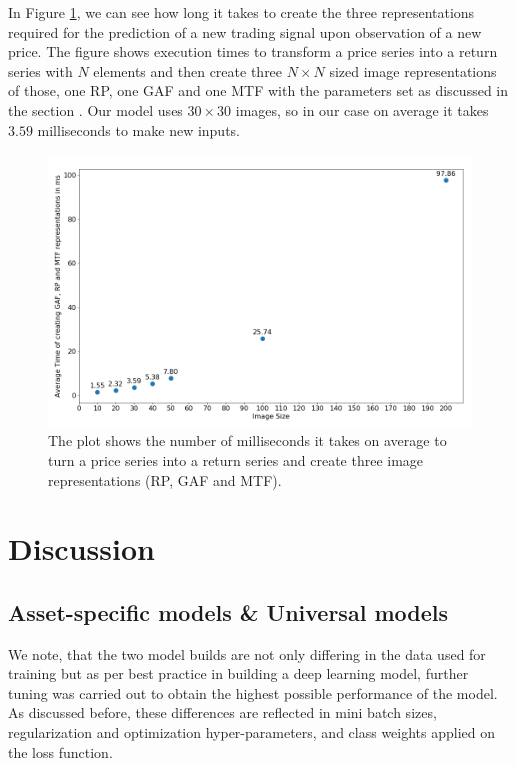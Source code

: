 \documentclass[12pt, a4paper]{article}
\begin{document}
In Figure \ref{fig:imageCrea}, we can see how long it takes to create the three representations required for the prediction of a new trading signal upon observation of a new price. The figure shows execution times to transform a price series into a return series with $N$ elements and then create three $N \times N$ sized image representations of those, one RP, one GAF and one MTF with the parameters set as discussed in the section . Our model uses $30 \times 30$ images, so in our case on average it takes $3.59$ milliseconds to make new inputs. 

\begin{figure}[h]
    \centering
    \includegraphics[width=\textwidth]{images/Image_Trf_Times.png}
    \caption{The plot shows the number of milliseconds it takes on average to turn a price series into a return series and create three image representations (RP, GAF and MTF).}
    \label{fig:imageCrea}
\end{figure}

\section{Discussion}
\label{sec:Discuss}

\subsection{Asset-specific models \& Universal models}

We note, that the two model builds are not only differing in the data used for training but as per best practice in building a deep learning model, further tuning was carried out to obtain the highest possible performance of the model. As discussed before, these differences are reflected in mini batch sizes, regularization and optimization hyper-parameters, and class weights applied on the loss function.
\end{document}
